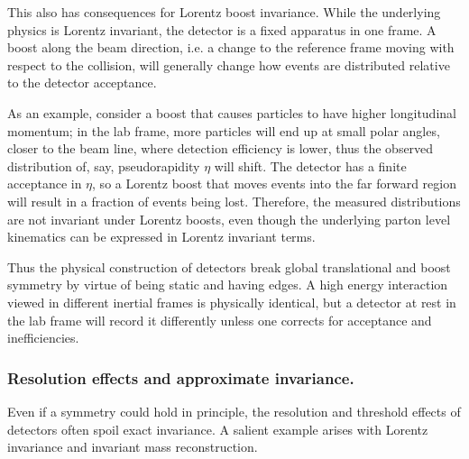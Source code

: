             This also has consequences for Lorentz boost invariance.
            While the underlying physics is Lorentz invariant, the detector is a fixed apparatus in one frame.
            A boost along the beam direction, i.e. a change to the reference frame moving with respect to the collision, will generally change how events are distributed relative to the detector acceptance.
            
            As an example, consider a boost that causes particles to have higher longitudinal momentum;
            in the lab frame, more particles will end up at small polar angles, closer to the beam line, where detection efficiency is lower, thus the observed distribution of, say, pseudorapidity $\eta$ will shift.
            The detector has a finite acceptance in $\eta$, so a Lorentz boost that moves events into the far forward region will result in a fraction of events being lost.
            Therefore, the measured distributions are not invariant under Lorentz boosts, even though the underlying parton level kinematics can be expressed in Lorentz invariant terms.
            
            Thus the physical construction of detectors break global translational and boost symmetry by virtue of being static and having edges.
            A high energy interaction viewed in different inertial frames is physically identical, but a detector at rest in the lab frame will record it differently unless one corrects for acceptance and inefficiencies.

        \subsubsection{Resolution effects and approximate invariance.}
            Even if a symmetry could hold in principle, the resolution and threshold effects of detectors often spoil exact invariance.
            A salient example arises with Lorentz invariance and invariant mass reconstruction.
            
